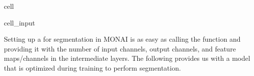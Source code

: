 \documentclass[letterpaper,10pt,english]{jupyterBook}
\begin{document}
\begin{sphinxuseclass}{cell}\begin{sphinxVerbatimInput}

\begin{sphinxuseclass}{cell_input}
\begin{sphinxVerbatim}[commandchars=\\\{\}]
      
\end{sphinxVerbatim}

\end{sphinxuseclass}\end{sphinxVerbatimInput}

\end{sphinxuseclass}
\sphinxAtStartPar
Setting up a  for segmentation in MONAI is as easy as calling the  function and providing it with the number of input channels, output channels, and feature maps/channels in the intermediate layers. The following provides us with a model that is optimized during training to perform segmentation.
\end{document}

